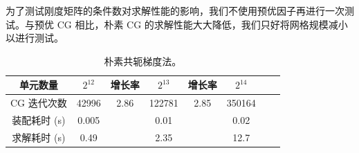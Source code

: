 \documentclass[lang=cn,11pt,a4paper]{elegantpaper}
\begin{document}
为了测试刚度矩阵的条件数对求解性能的影响，我们不使用预优因子再进行一次测试。与预优 CG 相比，朴素 CG 的求解性能大大降低，我们只好将网格规模减小以进行测试。

\begin{table}[H]
    \centering
    \begin{tabular}{|c|c|c|c|c|c|c|c|}
    \hline
    单元数量                    & $2^{12}$ & 增长率 & $2^{13}$ & 增长率 & $2^{14}$ \\ \hline
    CG 迭代次数            & 42996 & 2.86 & 122781 & 2.85 & 350164\\    
\hline
    装配耗时 (s)           & 0.005          &      & 0.01           &      & 0.02     \\ \hline
    求解耗时 (s)           & 0.49          &      & 2.35           &      & 12.7     \\ \hline
    \end{tabular}
    \caption{\small 朴素共轭梯度法。}
\end{table}

\appendix
\addappheadtotoc
\end{document}
